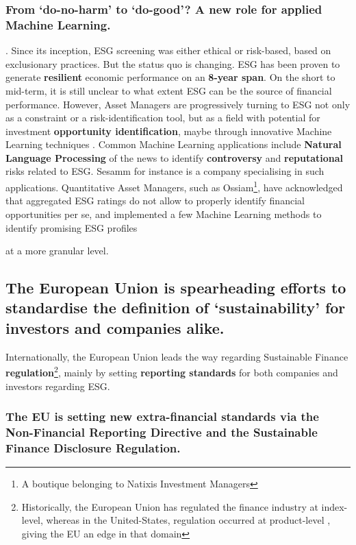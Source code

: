 \documentclass[12pt]{report}
\begin{document}
{\subsubsection{From ‘do-no-harm’ to ‘do-good’? A new role for applied Machine Learning.}. 
Since its inception, ESG screening was either ethical or risk-based, based on exclusionary practices. But the status quo is changing. ESG has been proven \citep{esgresilience} to generate \textbf{resilient} economic performance on an \textbf{8-year span}. On the short to mid-term, it is still unclear to what extent ESG can be the source of financial performance. However, Asset Managers are progressively turning to ESG not only as a constraint or a risk-identification tool, but as a field with potential for investment \textbf{opportunity identification}, maybe through innovative Machine Learning techniques  \citep{defranco2020esg}. Common Machine Learning applications include \textbf{Natural Language Processing} of the news to identify \textbf{controversy} and \textbf{reputational} risks related to ESG. Sesamm for instance is a company specialising in such applications.
Quantitative Asset Managers, such as Ossiam\footnote{A boutique belonging to Natixis Investment Managers}, have acknowledged that aggregated ESG ratings do not allow to properly identify financial opportunities per se, and implemented a few Machine Learning methods to identify promising ESG profiles} \citep{ossiamML} at a more granular level. 


\subsection{The European Union is spearheading efforts to standardise the definition of ‘sustainability’ for investors and companies alike.}
Internationally, the European Union leads the way regarding Sustainable Finance \textbf{regulation}\footnote{Historically, the European Union has regulated the finance industry at index-level, whereas in the United-States, regulation occurred at product-level \citep{msciperspectives}, giving the EU an edge in that domain}, mainly by setting \textbf{reporting standards} for both companies and investors regarding ESG. 

\subsubsection{The EU is setting new extra-financial standards via the Non-Financial Reporting Directive and the Sustainable Finance Disclosure Regulation.}
\end{document}
